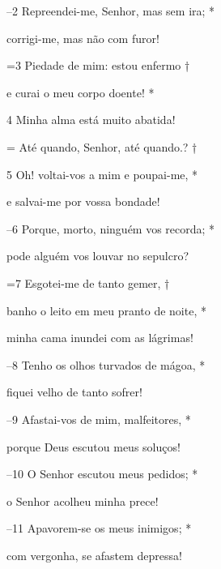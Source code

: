 –2 Repreendei-me, Senhor, mas sem ira; *

corrigi-me, mas não com furor!

=3 Piedade de mim: estou enfermo †

e curai o meu corpo doente! *

4 Minha alma está muito abatida!

= Até quando, Senhor, até quando.? †

5 Oh! voltai-vos a mim e poupai-me, *

e salvai-me por vossa bondade!

–6 Porque, morto, ninguém vos recorda; *

pode alguém vos louvar no sepulcro?

=7 Esgotei-me de tanto gemer, †

banho o leito em meu pranto de noite, *

minha cama inundei com as lágrimas!

–8 Tenho os olhos turvados de mágoa, *

fiquei velho de tanto sofrer!

–9 Afastai-vos de mim, malfeitores, *

porque Deus escutou meus soluços!

–10 O Senhor escutou meus pedidos; *

o Senhor acolheu minha prece!

–11 Apavorem-se os meus inimigos; *

com vergonha, se afastem depressa!